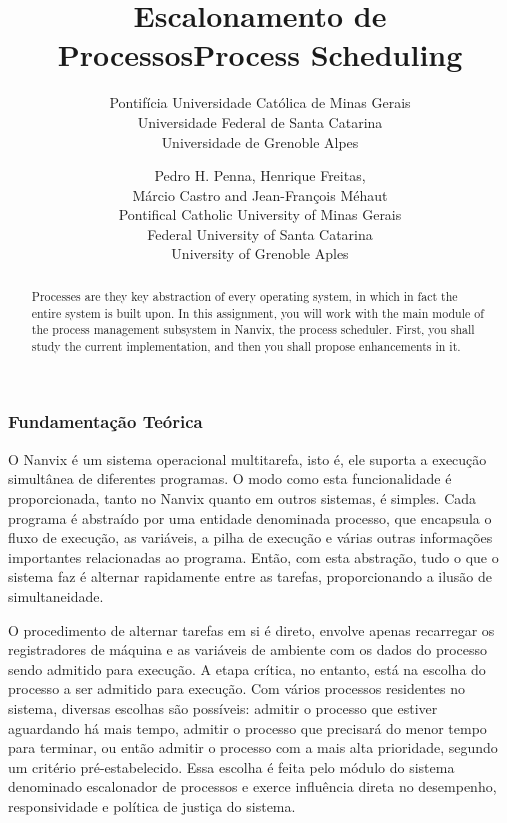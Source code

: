 \documentclass[11pt]{article}
\title{Escalonamento de Processos}
\author{
	\small Pontifícia Universidade Católica de Minas Gerais\\
	\small Universidade Federal de Santa Catarina\\
	\small Universidade de Grenoble Alpes
}
\date{}
\title{Process Scheduling}
\author{
	Pedro H. Penna, Henrique Freitas,\\%
	Márcio Castro and Jean-François Méhaut\\[0.3em]
	\small Pontifical Catholic University of Minas Gerais\\
	\small Federal University of Santa Catarina\\
	\small University of Grenoble Aples}
\date{}
\newif\ifbr
\newif\ifen
\begin{document}
\maketitle

\begin{abstract}

\ifbr
	\noindent Processos consistem na abstração fundamental de um sistema
	operacional: todo o resto do sistema é arquitetado com base nesta
	entidade. Neste projeto, você trabalhará com o principal componente do
	módulo de gerenciamento de processos do Nanvix, o escalonador de
	processos. Primeiramente, você irá estudar como o componente existente
	opera e, em seguida, irá propor melhorias a ele.
\else\ifen
	\noindent Processes are they key abstraction of every operating
	system, in which in fact the entire system is built upon. In this
	assignment, you will work with the main module of the process
	management subsystem in Nanvix, the process scheduler. First, you shall
	study the current implementation, and then you shall propose
	enhancements in it.
\fi\fi

\end{abstract}

\ifbr
	\subsubsection*{Fundamentação Teórica}

		O Nanvix é um sistema operacional multitarefa, isto é, ele suporta a
		execução simultânea de diferentes programas. O modo como esta
		funcionalidade é proporcionada, tanto no Nanvix quanto em outros
		sistemas, é simples. Cada programa é abstraído por uma entidade
		denominada processo, que encapsula o fluxo de execução, as
		variáveis, a pilha de execução e várias outras informações
		importantes relacionadas ao programa. Então, com esta abstração,
		tudo o que o sistema faz é alternar rapidamente entre as tarefas,
		proporcionando a ilusão de simultaneidade.

		O procedimento de alternar tarefas em si é direto, envolve apenas
		recarregar os registradores de máquina e as variáveis de ambiente
		com os dados do processo sendo admitido para execução. A etapa
		crítica, no entanto, está na escolha do processo a ser admitido para
		execução. Com vários processos residentes no sistema, diversas
		escolhas são possíveis: admitir o processo que estiver aguardando há
		mais tempo, admitir o processo que precisará do menor tempo para
		terminar, ou então admitir o processo com a mais alta prioridade,
		segundo um critério pré-estabelecido. Essa escolha é feita pelo
		módulo do sistema denominado escalonador de processos e exerce
		influência direta no desempenho, responsividade e política de
		justiça do sistema.
\else\ifen
\end{document}
